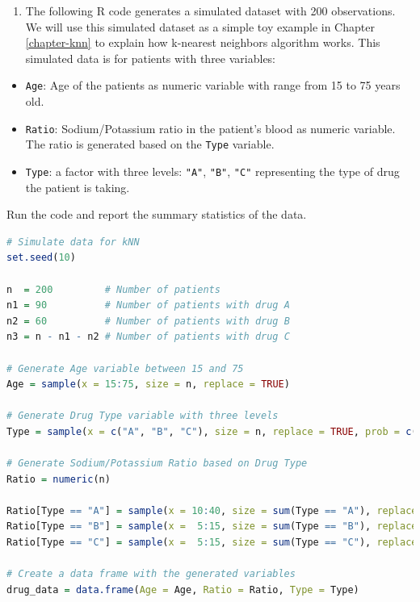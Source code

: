 \documentclass[
]{book}
\newcommand{\passthrough}[1]{#1}
\providecommand{\tightlist}{%
  \setlength{\itemsep}{0pt}\setlength{\parskip}{0pt}}
\theoremstyle{definition}
\theoremstyle{definition}
\theoremstyle{definition}
\theoremstyle{definition}
\theoremstyle{remark}
\begin{document}
\begin{enumerate}
\def\labelenumi{\arabic{enumi}.}
\setcounter{enumi}{16}
\tightlist
\item
  The following R code generates a simulated dataset with 200 observations. We will use this simulated dataset as a simple toy example in Chapter \ref{chapter-knn} to explain how k-nearest neighbors algorithm works. This simulated data is for patients with three variables:
\end{enumerate}

\begin{itemize}
\tightlist
\item
  \passthrough{\lstinline!Age!}: Age of the patients as numeric variable with range from 15 to 75 years old.\\
\item
  \passthrough{\lstinline!Ratio!}: Sodium/Potassium ratio in the patient's blood as numeric variable. The ratio is generated based on the \passthrough{\lstinline!Type!} variable.
\item
  \passthrough{\lstinline!Type!}: a factor with three levels: \passthrough{\lstinline!"A"!}, \passthrough{\lstinline!"B"!}, \passthrough{\lstinline!"C"!} representing the type of drug the patient is taking.
\end{itemize}

Run the code and report the summary statistics of the data.

\begin{lstlisting}[language=R]
# Simulate data for kNN
set.seed(10)

n  = 200         # Number of patients
n1 = 90          # Number of patients with drug A
n2 = 60          # Number of patients with drug B 
n3 = n - n1 - n2 # Number of patients with drug C

# Generate Age variable between 15 and 75
Age = sample(x = 15:75, size = n, replace = TRUE)

# Generate Drug Type variable with three levels
Type = sample(x = c("A", "B", "C"), size = n, replace = TRUE, prob = c(n1, n2, n3))

# Generate Sodium/Potassium Ratio based on Drug Type
Ratio = numeric(n)

Ratio[Type == "A"] = sample(x = 10:40, size = sum(Type == "A"), replace = TRUE)
Ratio[Type == "B"] = sample(x =  5:15, size = sum(Type == "B"), replace = TRUE)
Ratio[Type == "C"] = sample(x =  5:15, size = sum(Type == "C"), replace = TRUE)

# Create a data frame with the generated variables
drug_data = data.frame(Age = Age, Ratio = Ratio, Type = Type)
\end{lstlisting}
\end{document}
